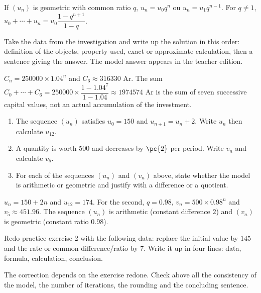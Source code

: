\begin{summary}If $(u_n)$ is geometric with common ratio $q$, $u_n=u_0q^n$ ou $u_n=u_1q^{n-1}$. For $q\neq1$, $u_0+\cdots+u_n=u_0\dfrac{1-q^{n+1}}{1-q}$.\end{summary}

\begin{example}
Take the data from the investigation and write up the solution in this order: definition of the objects, property used, exact or approximate calculation, then a sentence giving the answer. The model answer appears in the teacher edition.
\end{example}
\begin{solution}$C_n=\num{250000}\times\num{1,04}^n$ and $C_6\approx\num{316330}$ Ar. The sum $C_0+\cdots+C_6=\num{250000}\times\dfrac{1-\num{1,04}^7}{1-\num{1,04}}\approx\num{1974574}$ Ar is the sum of seven successive capital values, not an actual accumulation of the investment.\end{solution}

\begin{exercise}[essential]
\begin{enumerate}\item The sequence $(u_n)$ satisfies $u_0=150$ and $u_{n+1}=u_n+2$. Write $u_n$ then calculate $u_{12}$.\item A quantity is worth $500$ and decreases by $\pc{2}$ per period. Write $v_n$ and calculate $v_5$.\item For each of the sequences $(u_n)$ and $(v_n)$ above, state whether the model is arithmetic or geometric and justify with a difference or a quotient.\end{enumerate}
\end{exercise}
\begin{solution}$u_n=150+2n$ and $u_{12}=174$. For the second, $q=\num{0,98}$, $v_n=500\times\num{0,98}^n$ and $v_5\approx\num{451,96}$. The sequence $(u_n)$ is arithmetic (constant difference $2$) and $(v_n)$ is geometric (constant ratio $\num{0,98}$).\end{solution}


\begin{homework}Redo practice exercise 2 with the following data: replace the initial value by $145$ and the rate or common difference/ratio by $7$. Write it up in four lines: data, formula, calculation, conclusion.\end{homework}
\begin{solution}The correction depends on the exercise redone. Check above all the consistency of the model, the number of iterations, the rounding and the concluding sentence.\end{solution}

